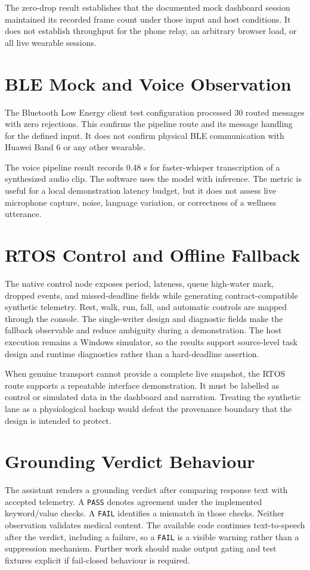 The zero-drop result establishes that the documented mock dashboard session maintained its recorded frame count under those input and host conditions. It does not establish throughput for the phone relay, an arbitrary browser load, or all live wearable sessions.

\section{BLE Mock and Voice Observation}
The Bluetooth Low Energy client test configuration processed 30 routed messages with zero rejections. This confirms the pipeline route and its message handling for the defined input. It does not confirm physical BLE communication with Huawei Band 6 or any other wearable.

The voice pipeline result records 0.48 s for faster-whisper transcription of a synthesized audio clip. The software uses the  model with  inference. The metric is useful for a local demonstration latency budget, but it does not assess live microphone capture, noise, language variation, or correctness of a wellness utterance.

\section{RTOS Control and Offline Fallback}
The native control node exposes period, lateness, queue high-water mark, dropped events, and missed-deadline fields while generating contract-compatible synthetic telemetry. Rest, walk, run, fall, and automatic controls are mapped through the console. The single-writer design and diagnostic fields make the fallback observable and reduce ambiguity during a demonstration. The host execution remains a Windows simulator, so the results support source-level task design and runtime diagnostics rather than a hard-deadline assertion.

When genuine transport cannot provide a complete live snapshot, the RTOS route supports a repeatable interface demonstration. It must be labelled as control or simulated data in the dashboard and narration. Treating the synthetic lane as a physiological backup would defeat the provenance boundary that the design is intended to protect.

\section{Grounding Verdict Behaviour}
The assistant renders a grounding verdict after comparing response text with accepted telemetry. A \texttt{PASS} denotes agreement under the implemented keyword/value checks. A \texttt{FAIL} identifies a mismatch in those checks. Neither observation validates medical content. The available code continues text-to-speech after the verdict, including a failure, so a \texttt{FAIL} is a visible warning rather than a suppression mechanism. Further work should make output gating and test fixtures explicit if fail-closed behaviour is required.

